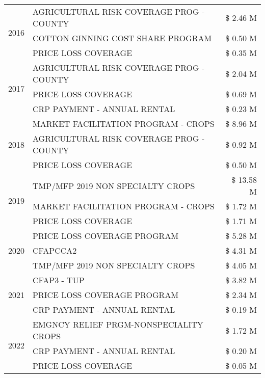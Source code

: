 \begin{tabular}{llr}
\cline{1-3}
\multirow[t]{3}{*}{2016} & AGRICULTURAL RISK COVERAGE PROG - COUNTY & \$ 2.46 M \\
 & COTTON GINNING COST SHARE PROGRAM & \$ 0.50 M \\
 & PRICE LOSS COVERAGE & \$ 0.35 M \\
\cline{1-3}
\multirow[t]{3}{*}{2017} & AGRICULTURAL RISK COVERAGE PROG - COUNTY & \$ 2.04 M \\
 & PRICE LOSS COVERAGE & \$ 0.69 M \\
 & CRP PAYMENT - ANNUAL RENTAL & \$ 0.23 M \\
\cline{1-3}
\multirow[t]{3}{*}{2018} & MARKET FACILITATION PROGRAM - CROPS & \$ 8.96 M \\
 & AGRICULTURAL RISK COVERAGE PROG - COUNTY & \$ 0.92 M \\
 & PRICE LOSS COVERAGE & \$ 0.50 M \\
\cline{1-3}
\multirow[t]{3}{*}{2019} & TMP/MFP 2019 NON SPECIALTY CROPS & \$ 13.58 M \\
 & MARKET FACILITATION PROGRAM - CROPS & \$ 1.72 M \\
 & PRICE LOSS COVERAGE & \$ 1.71 M \\
\cline{1-3}
\multirow[t]{3}{*}{2020} & PRICE LOSS COVERAGE PROGRAM & \$ 5.28 M \\
 & CFAPCCA2 & \$ 4.31 M \\
 & TMP/MFP 2019 NON SPECIALTY CROPS & \$ 4.05 M \\
\cline{1-3}
\multirow[t]{3}{*}{2021} & CFAP3 - TUP & \$ 3.82 M \\
 & PRICE LOSS COVERAGE PROGRAM & \$ 2.34 M \\
 & CRP PAYMENT - ANNUAL RENTAL & \$ 0.19 M \\
\cline{1-3}
\multirow[t]{3}{*}{2022} & EMGNCY RELIEF PRGM-NONSPECIALITY CROPS & \$ 1.72 M \\
 & CRP PAYMENT - ANNUAL RENTAL & \$ 0.20 M \\
 & PRICE LOSS COVERAGE & \$ 0.05 M \\
\cline{1-3}
\bottomrule
\end{tabular}
